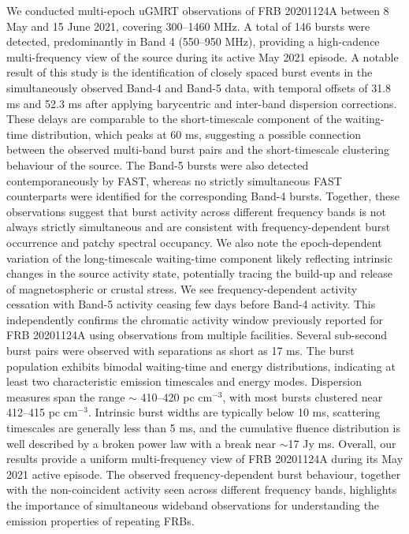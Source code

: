 \documentclass[preprint2, trackchanges]{aastex631}
\begin{document}
We conducted multi-epoch uGMRT observations of FRB 20201124A between 8 May and 15 June 2021, covering 300–1460 MHz. A total of 146 bursts were detected, predominantly in Band 4 (550--950 MHz), providing a high-cadence multi-frequency view of the source during its active May 2021 episode. A notable result of this study is the identification of closely spaced burst events in the simultaneously observed Band-4 and Band-5 data, with temporal offsets of 31.8 ms and 52.3 ms after applying barycentric and inter-band dispersion corrections. These delays are comparable to the short-timescale component of the waiting-time distribution, which peaks at 60 ms, suggesting a possible connection between the observed multi-band burst pairs and the short-timescale clustering behaviour of the source. The Band-5 bursts were also detected contemporaneously by FAST, whereas no strictly simultaneous FAST counterparts were identified for the corresponding Band-4 bursts. Together, these observations suggest that burst activity across different frequency bands is not always strictly simultaneous and are consistent with frequency-dependent burst occurrence and patchy spectral occupancy. We also note the epoch-dependent variation of the long-timescale waiting-time component likely reflecting intrinsic changes in the source activity state, potentially tracing the build-up and release of magnetospheric or crustal stress. We see frequency-dependent activity cessation with Band-5 activity ceasing few days before Band-4 activity. This independently confirms the chromatic activity window previously reported for FRB 20201124A using observations from multiple facilities. Several sub-second burst pairs were observed with separations as short as 17 ms. The burst population exhibits bimodal waiting-time and energy distributions, indicating at least two characteristic emission timescales and energy modes. Dispersion measures span the range $\sim$ 410--420 pc cm$^{-3}$, with most bursts clustered near 412--415 pc cm$^{-3}$. Intrinsic burst widths are typically below 10 ms, scattering timescales are generally less than 5 ms, and the cumulative fluence distribution is well described by a broken power law with a break near $\sim$17 Jy ms. Overall, our results provide a uniform multi-frequency view of FRB 20201124A during its May 2021 active episode. The observed frequency-dependent burst behaviour, together with the non-coincident activity seen across different frequency bands, highlights the importance of simultaneous wideband observations for understanding the emission properties of repeating FRBs.
\end{document}
